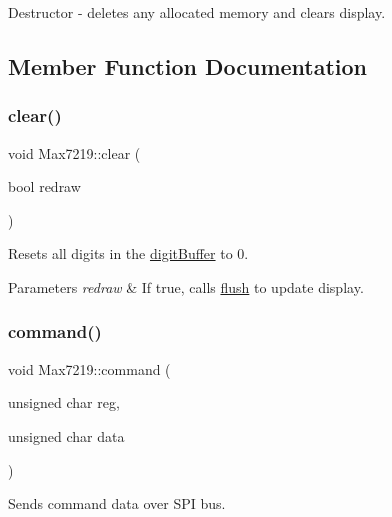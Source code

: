 Destructor -\/ deletes any allocated memory and clears display. 

\subsection{Member Function Documentation}
\mbox{\label{classdrumpi_1_1Max7219_ac29e3df34f72833d995db8bc1810f04d}} 
\subsubsection{\texorpdfstring{clear()}{clear()}}
{\footnotesize\ttfamily void Max7219\+::clear (\begin{DoxyParamCaption}\item[{bool}]{redraw }\end{DoxyParamCaption})}

Resets all digits in the \hyperlink{classdrumpi_1_1Max7219_ab26f32728dd82c00e39b6212436f291e}{digit\+Buffer} to 0. 
\begin{DoxyParams}{Parameters}
{\em redraw} & If true, calls \hyperlink{classdrumpi_1_1Max7219_a3b3f0f2a947caf27f65bd626f8e71f43}{flush} to update display. \\
\hline
\end{DoxyParams}
\mbox{\label{classdrumpi_1_1Max7219_a45fe4b7d187a021dca6c75ad7319ed6f}} 
\subsubsection{\texorpdfstring{command()}{command()}}
{\footnotesize\ttfamily void Max7219\+::command (\begin{DoxyParamCaption}\item[{unsigned char}]{reg,  }\item[{unsigned char}]{data }\end{DoxyParamCaption})\hspace{0.3cm}{\ttfamily [private]}}

Sends command data over S\+PI bus. \mbox{\label{classdrumpi_1_1Max7219_a3b3f0f2a947caf27f65bd626f8e71f43}} 
